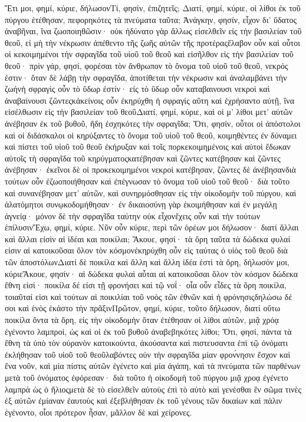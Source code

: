 Ἔτι μοι, φημί, κύριε, δήλωσονΤί, φησίν, ἐπιζητεῖς; Διατί, φημί, κύριε, οἱ λίθοι ἐκ τοῦ πύργου ἐτέθησαν, πεφορηκότες τὰ πνεύματα ταῦτα; Ἀνάγκην, φησίν, εἶχον δι’ ὕδατος ἀναβῆναι, ἵνα ζωοποιηθῶσιν· οὐκ ἠδύνατο γὰρ ἄλλως εἰσελθεῖν εἰς τὴν βασιλείαν τοῦ θεοῦ, εἰ μὴ τὴν νέκρωσιν ἀπέθεντο τῆς ζωῆς αὐτῶν τῆς προτέραςἔλαβον οὖν καὶ οὗτοι οἱ κεκοιμημένοι τὴν σφραγῖδα τοῦ υἱοῦ τοῦ θεοῦ καὶ εἰσῆλθον εἰς τὴν βασιλείαν τοῦ θεοῦ· πρὶν γάρ, φησί, φορέσαι τὸν ἄνθρωπον τὸ ὄνομα τοῦ υἱοῦ τοῦ θεοῦ, νεκρός ἐστιν· ὅταν δὲ λάβῃ τὴν σφραγῖδα, ἀποτίθεται τὴν νέκρωσιν καὶ ἀναλαμβάνει τὴν ζωήνἡ σφραγὶς οὖν τὸ ὕδωρ ἐστίν· εἰς τὸ ὕδωρ οὖν καταβαινουσι νεκροὶ καὶ ἀναβαίνουσι ζῶντεςκἀκείνοις οὖν ἐκηρύχθη ἡ σφραγὶς αὕτη καὶ ἐχρήσαντο αὐτῇ, ἵνα εἰσέλθωσιν εἰς τὴν βασιλείαν τοῦ θεοῦΔιατί, φημί, κύριε, καὶ οἱ μ’ λίθοι μετ’ αὐτῶν ἀνέβησαν ἐκ τοῦ βυθοῦ, ἤδη ἐσχηκότες τὴν σφραγῖδα; Ὅτι, φησίν, οὗτοι οἱ ἀπόστολοι καὶ οἱ διδάσκαλοι οἱ κηρύξαντες τὸ ὄνομα τοῦ υἱοῦ τοῦ θεοῦ, κοιμηθέντες ἐν δύναμει καὶ πίστει τοῦ υἱοῦ τοῦ θεοῦ ἐκήρυξαν καὶ τοῖς πορκεκοιμημένοις καὶ αὐτοὶ ἔδωκαν αὐτοῖς τὴ σφραγῖδα τοῦ κηρύγματοςκατέβησαν καὶ ζῶντες κατέβησαν καὶ ζῶντες ἀνέβησαν· ἐκεῖνοι δὲ οἱ προκεκοιμημένοι νεκροὶ κατέβησαν, ζῶντες δὲ ἀνέβησανδιὰ τούτων οὖν ἐζωοποιήθησαν καὶ ἐπέγνωσαν τὸ ὄνομα τοῦ υἱοῦ τοῦ θεοῦ· διὰ τοῦτο καὶ συνανέβησαν μετ’ αὐτῶν, καὶ συνηρμόσθησαν εἰς τὴν οἰκοδομὴν τοῦ πύργου, καὶ ἀλατόμητοι συνῳκοδομήθησαν· ἐν δικαιοσύνῃ γὰρ ἐκοιμήθησαν καὶ ἐν μεγάλῃ ἁγνείᾳ· μόνον δὲ τὴν σφραγῖδα ταύτην οὐκ εἶχονἔχεις οὖν καὶ τὴν τούτων ἐπίλυσινἜχω, φημί, κύριε.
Νῦν οὖν κύριε, περὶ τῶν ὀρέων μοι δήλωσον· διατί ἄλλαι καὶ ἄλλαι εἰσὶν αἱ ἰδέαι και ποικίλαι; Ἄκουε, φησί· τὰ ὄρη ταῦτα τὰ δώδεκα φυλαί εἰσιν αἱ κατοικοῦσαι ὅλον τὸν κόσμονἐκηρύχθη οὖν εἰς ταύτας ὁ υἱὸς τοῦ θεοῦ διὰ τῶν ἀποστόλωνΔιατί δὲ ποικίλα καὶ ἄλλη καὶ ἄλλη ἰδέα ἐστὶ τὰ ὄρη, δήλωσόν μοι, κύριεἌκουε, φησίν· αἱ δώδεκα φυλαὶ αὗται αἱ κατοικοῦσαι ὅλον τὸν κόσμον δώδεκα ἔθνη εἰσί· ποικίλα δέ εἰσι τῇ φρονήσει καὶ τῷ νοΐ· οἷα οὖν εἶδες τὰ ὄρη ποικίλα, τοιαῦταί εἰσι καὶ τούτων αἱ ποικιλίαι τοῦ νοὸς τῶν ἐθνῶν καὶ ἡ φρόνησιςδηλώσω δέ σοι καὶ ἑνὸς ἑκάστο τὴν πρᾶξινΠρῶτον, φημί, κύριε, τοῦτο δήλωσον, διατί οὕτω ποικίλα ὄντα τὰ ὄρη, εἰς τὴν οἰκοδομὴν ὅταν ἐτέθησαν οἱ λίθοι αὐτῶν, μιᾷ χρόᾳ ἐγένοντο λαμπροί, ὡς καὶ οἱ ἐκ τοῦ βυθοῦ ἀναβεβηκότες λίθοι; Ὅτι, φησί, πάντα τὰ ἔθνη τὰ ὑπὸ τὸν οὐρανὸν κατοικούντα, ἀκούσαντα καὶ πιστευσαντα ἐπὶ τῷ ὀνόματι ἐκλήθησαν τοῦ υἱοῦ τοῦ θεοῦλαβόντες οὐν τὴν σφραγῖδα μίαν φρον́νησιν ἔσχον καὶ ἕνα νοῦν, καὶ μία πίστις αὐτῶν ἐγένετο καὶ μία ἀγάπη, καὶ τὰ πνεύματα τῶν παρθένων μετὰ τοῦ ὀνόματος ἐφόρεσαν· διὰ τοῦτο ἡ οἰκοδομὴ τοῦ πύργου μιᾷ χροᾳ ἐγένετο λαμπρὰ ὡς ὁ ἥλιοςμετὰ δὲ τὸ εἰσελθεῖν αὐτοὺς ἐπὶ τὸ αὐτὸ καὶ γενέσθαι ἓν σῶμα τινὲς ἐξ αὐτῶν ἐμίαναν ἑαυτοὺς καὶ ἐξεβλήθησαν ἐκ τοῦ γένους τῶν δικαίων καὶ πάλιν ἐγένοντο, οἷοι πρότερον ἦσαν, μᾶλλον δὲ καὶ χείρονες.
